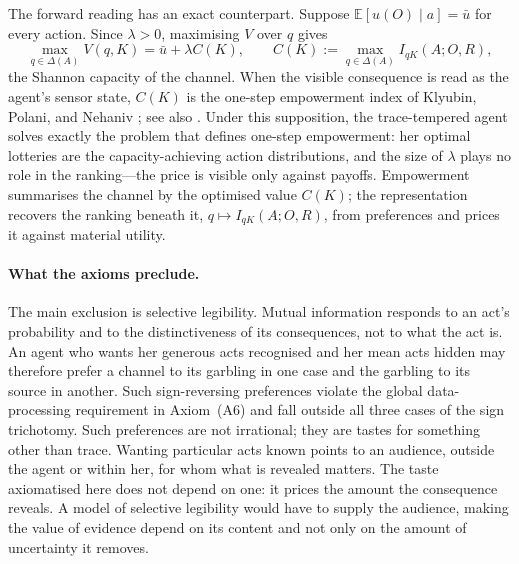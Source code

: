 \documentclass[11pt,a4paper]{article}
\theoremstyle{definition}
\newcommand{\E}{\mathbb E}
\newcommand{\1}{\mathbf 1}
\begin{document}
The forward reading has an exact counterpart.  Suppose $\E[u(O)\mid a]=\bar u$ for every action.  Since
$\lambda>0$, maximising $V$ over $q$ gives
\[
 \max_{q\in\Delta(A)}V(q,K)=\bar u+\lambda C(K),
 \qquad
 C(K):=\max_{q\in\Delta(A)}I_{qK}(A;O,R),
\]
the Shannon capacity of the channel.  When the visible consequence is read as the agent's sensor state, $C(K)$
is the one-step empowerment index of Klyubin, Polani, and Nehaniv \cite{KlyubinPolaniNehaniv2005}; see also
\cite{SalgeGlackinPolani2014}.  Under this supposition, the trace-tempered agent solves exactly the problem
that defines one-step empowerment: her optimal lotteries are the capacity-achieving action distributions, and
the size of $\lambda$ plays no role in the ranking---the price is visible only against payoffs.  Empowerment
summarises the channel by the optimised value $C(K)$; the representation recovers the ranking beneath it,
$q\mapsto I_{qK}(A;O,R)$, from preferences and prices it against material utility.

\paragraph{What the axioms preclude.}
The main exclusion is selective legibility.  Mutual information responds to an act's
probability and to the distinctiveness of its consequences, not to what the act is.  An agent who wants her generous
acts recognised and her mean acts hidden may therefore prefer a channel to its garbling in one case and the garbling to its source
in another.  Such sign-reversing preferences violate the global data-processing requirement in Axiom~\textup{(A6)} and fall
outside all three cases of the sign trichotomy.  Such preferences are not irrational; they are tastes for
something other than trace.  Wanting particular acts known points to an audience, outside the agent or within
her, for whom what is revealed matters.  The taste axiomatised here does not depend on one: it prices the amount
the consequence reveals.  A model of selective legibility would have to supply the audience, making
the value of evidence depend on its content and not only on the amount of uncertainty it removes.
\end{document}
